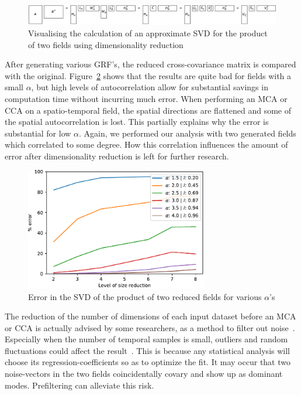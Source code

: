 \documentclass[ijgi,article,submit,moreauthors,pdftex,10pt,a4paper]{Definitions/mdpi}
\begin{document}
\begin{figure}[H]
\centering
\includegraphics[width=\textwidth]{Results/randomisedSquareProductSVD.pdf}
\caption[Approximate product SVD]{Visualising the calculation of an approximate SVD for the product of two fields using dimensionality reduction}
\label{fig:randomisedSquareProductSVD}
\end{figure}

After generating various GRF's, the reduced cross-covariance matrix is compared with the original. Figure~\ref{fig:plotRandomisedSizeReducedMatrixProduct} shows that the results are quite bad for fields with a small $\alpha$, but high levels of autocorrelation allow for substantial savings in computation time without incurring much error. When performing an MCA or CCA on a spatio-temporal field, the spatial directions are flattened and some of the spatial autocorrelation is lost. This partially explains why the error is substantial for low $\alpha$. Again, we performed our analysis with two generated fields which correlated to some degree. How this correlation influences the amount of error after dimensionality reduction is left for further research.

\begin{figure}[H]
\centering
\includegraphics[width=80mm]{Results/plotRandomisedSizeReducedMatrixProduct.pdf}
\caption[Error after reduction]{Error in the SVD of the product of two reduced fields for various $\alpha$'s}
\label{fig:plotRandomisedSizeReducedMatrixProduct}
\end{figure}

The reduction of the number of dimensions of each input dataset before an MCA or CCA is actually advised by some researchers, as a method to filter out noise~\cite{Barnett1987}. Especially when the number of temporal samples is small, outliers and random fluctuations could affect the result~\cite{Bretherton1992}. This is because any statistical analysis will choose its regression-coefficients so as to optimize the fit. It may occur that two noise-vectors in the two fields coincidentally covary and show up as dominant modes. Prefiltering can alleviate this risk.
\end{document}

